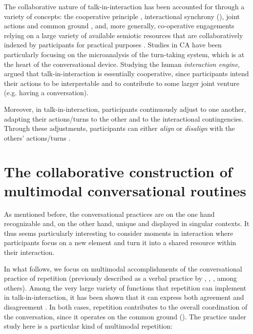 \documentclass[output=paper]{langscibook}
\begin{document}
The collaborative nature of talk-in-interaction has been accounted for through a variety of concepts: the cooperative principle \citep{Grice1975}, interactional synchrony (\citealt{CondonOgston1966}), joint actions and common ground \citep{Clark1996}, and, more generally, co-operative engagements relying on a large variety of available semiotic resources that are collaboratively indexed by participants for practical purposes \citep{Goodwin2018}. Studies in CA have been particularly focusing on the microanalysis of the turn-taking system, which is at the heart of the conversational device. Studying the human \textit{interaction engine}, \citet{Levinson2006} argued that talk-in-interaction is essentially cooperative, since participants intend their actions to be interpretable and to contribute to some larger joint venture (e.g. having a conversation). 

Moreover, in talk-in-interaction, participants continuously adjust to one another, adapting their actions/turns to the other and to the interactional contingencies. Through these adjustments, participants can either \textit{align} or \textit{disalign} with the others' actions/turns \citep{Stivers2008}. 

\section{The collaborative construction of multimodal conversational routines}\largerpage

As mentioned before, the conversational practices are on the one hand recognizable and, on the other hand, unique and displayed in singular contexts. It thus seems particularly interesting to consider moments in interaction where participants focus on a new element and turn it into a shared resource within their interaction. 

In what follows, we focus on multimodal accomplishments of the conversational practice of repetition (previously described as a verbal practice by \citealt{Traverso2005}, \citealt{Schegloff2007}, \citealt{Bazzanella2011}, among others). Among the very large variety of functions that repetition can implement in talk-in-interaction, it has been shown that it can express both agreement and disagreement \citep{Traverso2012}. In both cases, repetition contributes to the overall coordination of the conversation, since it operates on the common ground (\citealt{ClarkBernicot2008}). The practice under study here is a particular kind of multimodal repetition: 
\end{document}
